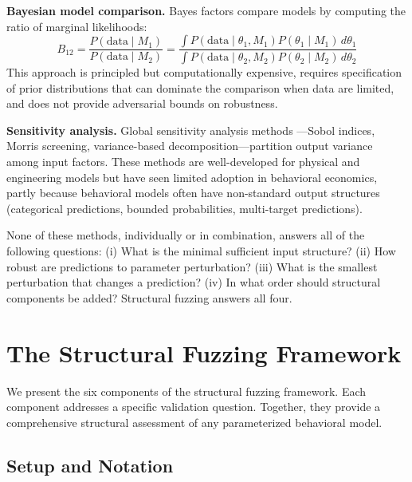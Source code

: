 \documentclass[12pt]{article}
\begin{document}
\textbf{Bayesian model comparison.}  Bayes factors \cite{kass1995} compare models by computing the ratio of marginal likelihoods:
\begin{equation}
    B_{12} = \frac{P(\text{data} \mid M_1)}{P(\text{data} \mid M_2)} = \frac{\int P(\text{data} \mid \theta_1, M_1) P(\theta_1 \mid M_1) \, d\theta_1}{\int P(\text{data} \mid \theta_2, M_2) P(\theta_2 \mid M_2) \, d\theta_2}
    \label{eq:bayes_factor}
\end{equation}
This approach is principled but computationally expensive, requires specification of prior distributions that can dominate the comparison when data are limited, and does not provide adversarial bounds on robustness.

\textbf{Sensitivity analysis.}  Global sensitivity analysis methods \cite{saltelli2008}---Sobol indices, Morris screening, variance-based decomposition---partition output variance among input factors.  These methods are well-developed for physical and engineering models but have seen limited adoption in behavioral economics, partly because behavioral models often have non-standard output structures (categorical predictions, bounded probabilities, multi-target predictions).

None of these methods, individually or in combination, answers all of the following questions: (i) What is the minimal sufficient input structure? (ii) How robust are predictions to parameter perturbation? (iii) What is the smallest perturbation that changes a prediction? (iv) In what order should structural components be added?  Structural fuzzing answers all four.


\section{The Structural Fuzzing Framework}
\label{sec:framework}

We present the six components of the structural fuzzing framework.  Each component addresses a specific validation question.  Together, they provide a comprehensive structural assessment of any parameterized behavioral model.

\subsection{Setup and Notation}
\end{document}
